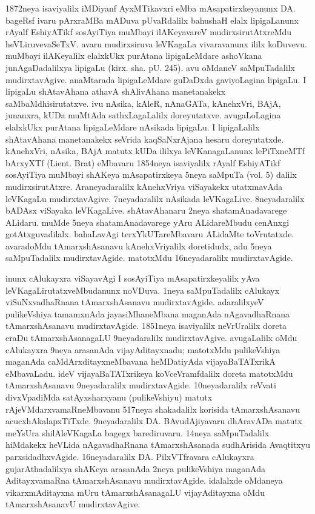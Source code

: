 \documentclass[11pt,a4size]{article}
\begin{document}
1872neya isaviyalilx iMDiyanf AyxMTikavxri eMba mAsapatirxkeyanunx
DA. bageRsf ivaru pArxraMBa mADuva pUvaRdalilx bahushaH elalx
lipigaLanunx rAyalf EshiyATikf sosAyiTiya muMbayi ilAKeyavareV
mudirxsirutAtxreMdu heVLiruvevaSeTxV. avaru mudirxsiruva leVKagaLa
vivaravanunx ililx koDuvevu. muMbayi ilAKeyalilx elalxkUkx purAtana
lipigaLeMdare ashoVkana junAgaDadalilxya lipigaLu
(kirx. sha. pU. 245). avu oMdaneV saMpuTadalilx
mudirxtavAgive. anaMtarada lipigaLeMdare guDaDxda gaviyoLagina
lipigaLu. I lipigaLu shAtavAhana athavA shAlivAhana manetanakekx
saMbaMdhisirutatxve. ivu nAsika, kAleR, nAnaGATa, kAnehxVri, BAjA,
junanxra, kUDa muMtAda sathxLagaLalilx doreyutatxve. avugaLoLagina
elalxkUkx purAtana lipigaLeMdare nAsikada lipigaLu. I lipigaLalilx
shAtavAhana manetanakekx seVrida kaqSaNxrAjana hesaru
doreyutatxde. kAnehxVri, nAsika, BAjA matutx kUDa ililxya
leVKanagaLanunx lePiTxneMTf bArxyXTf {\rm
    (Lient. Brat)} eMbavaru 1854neya isaviyalilx rAyalf EshiyATikf
sosAyiTiya muMbayi shAKeya mAsapatirxkeya 5neya saMpuTa
{\rm (vol. 5)} dalilx mudirxsirutAtxre. Araneyadaralilx
kAnehxVriya viSayakekx utatxmavAda leVKagaLu
mudirxtavAgive. 7neyadaralilx nAsikada leVKagaLive. 8neyadaralilx
bADAsx viSayaka leVKagaLive. shAtavAhanaru 2neya shatamAnadavarege
ALidaru. muMde 5neya shatamAnadavarege yAru ALidareMbudu cenAnxgi
gotAtxguvadilalx. bahaLavAgi terxYkUTareMbavaru ALidaMte
toVrutatxde. avaradoMdu tAmarxshAsanavu kAnehxVriyalilx doretidudx,
adu 5neya saMpuTadalilx mudirxtavAgide. matotxMdu 16neyadaralilx
mudirxtavAgide.

inunx cAlukayxra viSayavAgi I sosAyiTiya mAsapatirxkeyalilx yAva
leVKagaLirutatxveMbudanunx noVDuva. 1neya saMpuTadalilx cAlukayx
viSuNxvadhaRnana tAmarxshAsanavu mudirxtavAgide. adaralilxyeV
pulikeVshiya tamamxnAda jayasiMhaneMbana maganAda nAgavadhaRnana
tAmarxshAsanavu mudirxtavAgide. 1851neya isaviyalilx neVrUralilx
doreta eraDu tAmarxshAsanagaLU 9neyadaralilx
mudirxtavAgive. avugaLalilx oMdu cAlukayxra 9neya arasanAda
vijayAditayxnadu; matotxMdu pulikeVshiya maganAda
caMdArxditayxneMbavana heMDatiyAda vijayaBaTATxrikA eMbavaLadu. ideV
vijayaBaTATxrikeya koVceVramfdalilx doreta matotxMdu tAmarxshAsanavu
9neyadaralilx mudirxtavAgide. 10neyadaralilx reVvati divxVpadiMda
satAyxsharxyanu (pulikeVshiyu) matutx rAjeVMdarxvamaRneMbavanu 517neya
shakadalilx korisida tAmarxshAsanavu
acucxhAkalapxTiTxde. 9neyadaralilx DA. BAvudAjiyavaru dhAravADa matutx
meYsUra shilAleVKagaLa bagegx barediruvaru. 14neya saMpuTadalilx
hiMdakekx heVLida nAgavadhaRnana tAmarxshAsanada sudhArisida
Avaqtitxyu parxsidadhxvAgide. 16neyadaralilx DA. PilxVTfravara
cAlukayxra gujarAthadalilxya shAKeya arasanAda 2neya pulikeVshiya
maganAda AditayxvamaRna tAmarxshAsanavu mudirxtavAgide. idalalxde
oMdaneya vikarxmAditayxna mUru tAmarxshAsanagaLU vijayAditayxna oMdu
tAmarxshAsanavU mudirxtavAgive.
\end{document}
